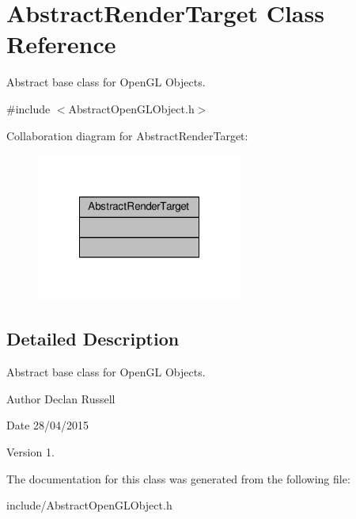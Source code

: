 \hypertarget{class_abstract_render_target}{\section{Abstract\-Render\-Target Class Reference}
\label{class_abstract_render_target}
}


Abstract base class for Open\-G\-L Objects.  




{\ttfamily \#include $<$Abstract\-Open\-G\-L\-Object.\-h$>$}



Collaboration diagram for Abstract\-Render\-Target\-:\nopagebreak
\begin{figure}[H]
\begin{center}
\leavevmode
\includegraphics[width=192pt]{class_abstract_render_target__coll__graph}
\end{center}
\end{figure}


\subsection{Detailed Description}
Abstract base class for Open\-G\-L Objects. 

\begin{DoxyAuthor}{Author}
Declan Russell 
\end{DoxyAuthor}
\begin{DoxyDate}{Date}
28/04/2015 
\end{DoxyDate}
\begin{DoxyVersion}{Version}
1. 
\end{DoxyVersion}


The documentation for this class was generated from the following file\-:\begin{DoxyCompactItemize}
\item 
include/Abstract\-Open\-G\-L\-Object.\-h\end{DoxyCompactItemize}
